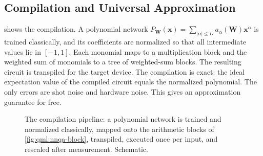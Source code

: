 \subsection{Compilation and Universal Approximation}\label{sec:qml:nnqa:theorem}

 shows the compilation. A polynomial network $P_{\bm{W}}(\bm{x}) = \sum_{|\alpha| \le D} a_\alpha(\bm{W}) \bm{x}^\alpha$ is trained classically, and its coefficients are normalized so that all intermediate values lie in $[-1,1]$. Each monomial maps to a multiplication block and the weighted sum of monomials to a tree of weighted-sum blocks. The resulting circuit is transpiled for the target device. The compilation is exact: the ideal expectation value of the compiled circuit equals the normalized polynomial. The only errors are shot noise and hardware noise. This gives an approximation guarantee for free.

\begin{figure}[htbp]
\centering
{}
\caption{The \nnqa{} compilation pipeline: a polynomial network is trained and normalized classically, mapped onto the arithmetic blocks of \cref{fig:qml:nnqa-block}, transpiled, executed once per input, and rescaled after measurement. Schematic.}\label{fig:qml:nnqa-pipeline}
\end{figure}

